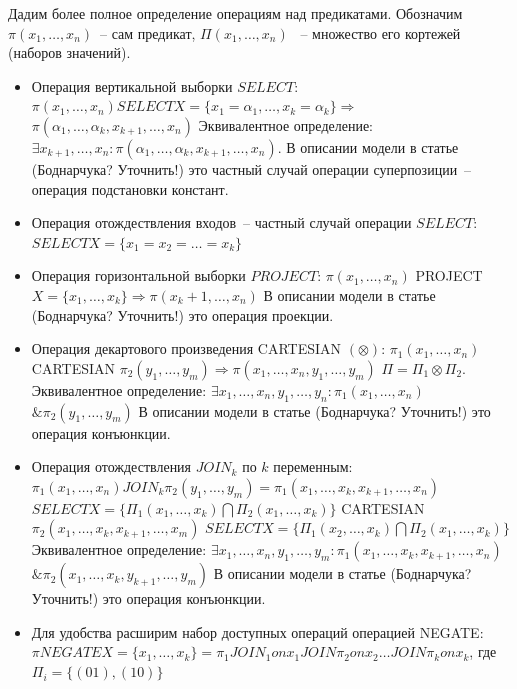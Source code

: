 \documentclass[12pt]{article}
\begin{document}
Дадим более полное определение операциям над предикатами.
Обозначим $\pi(x_1, \dots, x_n)$~-- сам предикат, $\Pi(x_1, \dots, x_n)$ ~-- множество его кортежей (наборов значений).
\begin{itemize}
\item Операция вертикальной выборки $SELECT$:
$\pi(x_1, \dots, x_n) SELECT X=\{x_1=\alpha_1, \ldots, x_k=\alpha_k\} \Longrightarrow$
$\pi(\alpha_1, \dots, \alpha_k, x_{k+1}, \dots, x_n)$
Эквивалентное определение: $\exists x_{k+1}, \dots, x_n: \pi(\alpha_1, \dots, \alpha_k, x_{k+1}, \dots, x_n)$. 
В описании модели в статье (Боднарчука? Уточнить!) это частный случай операции суперпозиции~-- операция подстановки констант.
\item Операция отождествления входов~-- частный случай операции $SELECT$: $SELECT X=\{x_1=x_2=\dots=x_k\}$
\item Операция горизонтальной выборки $PROJECT$:
$\pi(x_1, \dots, x_n)$ PROJECT $X=\{x_1, \dots, x_k\} \Longrightarrow \pi(x_k+1, \dots, x_n)$
В описании модели в статье (Боднарчука? Уточнить!) это операция проекции.
\item Операция декартового произведения CARTESIAN $(\otimes)$:
$\pi_1(x_1, \dots, x_n)$ CARTESIAN $\pi_2(y_1, \dots, y_m) \Longrightarrow \pi(x_1, \dots, x_n, y_1, \dots, y_m)$
$\Pi = \Pi_1 \otimes\Pi_2$.
Эквивалентное определение: $\exists x_1, \dots, x_n, y_1, \dots, y_n: \pi_1(x_{1}, \dots, x_n)$
$\& \pi_2(y_1, \dots, y_m)$
В описании модели в статье (Боднарчука? Уточнить!) это операция конъюнкции.
\item Операция отождествления $JOIN_k$ по $k$ переменным:
$\pi_1(x_1, \dots, x_n) JOIN_k \pi_2(y_1, \dots, y_m) = \pi_1(x_1, \dots, x_k, x_{k+1}, \dots, x_n)$
$SELECT X=\{\Pi_1(x_1, \dots, x_k) \bigcap \Pi_2(x_1, \dots, x_k)\}$ CARTESIAN $\pi_2(x_1, \dots, x_k, x_{k+1}, \dots, x_m)$
$SELECT X=\{\Pi_1(x_2, \dots, x_k) \bigcap  \Pi_2(x_1, \dots, x_k)\}$ 
Эквивалентное определение: $\exists x_1, \dots, x_n, y_1, \dots, y_m: \pi_1(x_{1}, \dots, x_k, x_{k+1}, \dots, x_n)$
$\& \pi_2(x_1, \dots, x_k, y_{k+1}, \dots, y_m)$
В описании модели в статье (Боднарчука? Уточнить!) это операция конъюнкции.
\item Для удобства расширим набор доступных операций операцией NEGATE: 
$\pi NEGATE X=\{x_1, \dots, x_k\} = \pi_1 JOIN_1 on x_1 JOIN \pi_2 on x_2 \dots JOIN \pi_k on x_k$, где 
$\Pi_i = \{ (01), (10) \}$
\end{itemize}
\end{document}
